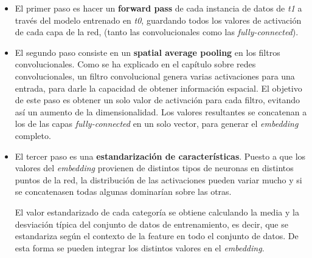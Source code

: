\documentclass[12,twoside]{TFG-GM}
\theoremstyle{definition}
\theoremstyle{remark}
\begin{document}
\begin{itemize}
\item El primer paso es hacer un \textbf{forward pass} de cada instancia de datos de \textit{t1} a través del modelo entrenado en \textit{t0}, guardando todos los valores de activación de cada capa de la red, (tanto las convolucionales como las \textit{fully-connected}). 

\item El segundo paso consiste en un \textbf{spatial average pooling} en los filtros convolucionales. Como se ha explicado en el capítulo sobre redes convolucionales, un filtro convolucional genera varias activaciones para una entrada, para darle la capacidad de obtener información espacial.  El objetivo de este paso es obtener un solo valor de activación para cada filtro, evitando así un aumento de la dimensionalidad. Los valores resultantes se concatenan a los de las capas \textit{fully-connected} en un solo vector, para generar el \textit{embedding} completo.

\item El tercer paso es una \textbf{estandarización de características}. Puesto a que los valores del \textit{embedding} provienen de distintos tipos de neuronas en distintos puntos de la red, la distribución de las activaciones pueden variar mucho y si se concatenasen todas algunas dominarían sobre las otras. \par
El valor estandarizado de cada categoría se obtiene calculando la media y la desviación típica del conjunto de datos de entrenamiento, es decir, que se estandariza según el contexto de la feature en todo el conjunto de datos. De esta forma se pueden integrar los distintos valores en el \textit{embedding}. 

\begin{figure}

\centering
{}
\caption{
\label{fig:caracterization}}
\end{figure}


\end{itemize}
\end{document}
